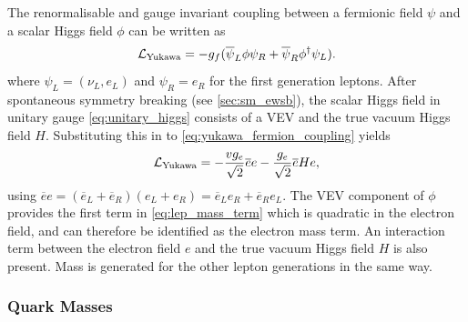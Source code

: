The renormalisable and gauge invariant coupling between a fermionic field $\psi$ and a scalar Higgs field $\phi$ can be written as 
%
\begin{equation}\label{eq:yukawa_fermion_coupling}
  \mathcal{L}_{\textnormal{Yukawa}} = 
  - g_f (\overline{\psi}_L \phi \psi_R + \overline{\psi}_R \phi^\dagger \psi_L) .
\end{equation}
%
where $\psi_L = (\nu_L, e_L)$ and $\psi_R = e_R$ for the first generation leptons.
After spontaneous symmetry breaking (see \cref{sec:sm_ewsb}), the scalar Higgs field in unitary gauge \cref{eq:unitary_higgs} consists of a VEV and the true vacuum Higgs field $H$.
Substituting this in to \cref{eq:yukawa_fermion_coupling} yields
%
\begin{equation}\label{eq:lep_mass_term}
  \mathcal{L}_{\textnormal{Yukawa}} = 
  - \frac{v g_e}{\sqrt{2}} \overline{e} e
  - \frac{g_e}{\sqrt{2}} \overline{e} H e ,
\end{equation}
%
using $\overline{e} e = (\overline{e}_L + \overline{e}_R)(e_L + e_R) = \overline{e}_L e_R + \overline{e}_R e_L$.
The VEV component of $\phi$ provides the first term in \cref{eq:lep_mass_term} which is quadratic in the electron field, and can therefore be identified as the electron mass term.
An interaction term between the electron field $e$ and the true vacuum Higgs field $H$ is also present.
Mass is generated for the other lepton generations in the same way.

\subsubsection{Quark Masses}

